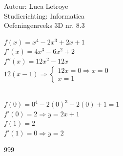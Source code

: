 \documentclass[a4paper]{article}
\begin{document}
  
\noindent \large Auteur: Luca Letroye \\
\noindent \large Studierichting: Informatica\\
\noindent \large Oefeningenreeks 3D nr. 8.3\\

\medskip


\normalsize

$ f(x) = x^4 - 2x^3+2x+1  $ \\

$f'(x) = 4x^3 - 6x^2+2$\\

$f''(x) = 12x^2-12x$\\

$12(x-1) \Rightarrow  \left\{ \begin{array}{l} 12x= 0 \Rightarrow x=0 \\ x=1  \end{array} \right.$\\

 \\

$f(0) = 0^4 - 2(0)^3 + 2(0) + 1 = 1 $ \\

$f'(0) = 2 \Rightarrow y=2x+1$\\

$f(1) = 2$\\

$f'(1) = 0 \Rightarrow y=2$










\begin{thebibliography}{999}
\end{thebibliography}
\end{document}
